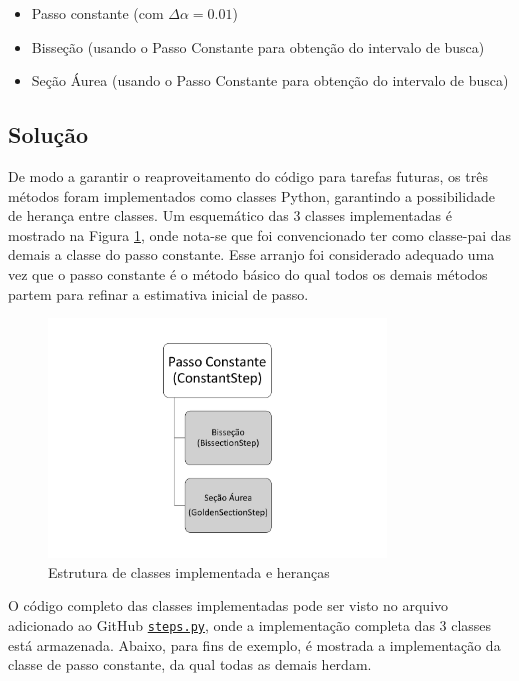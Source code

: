 \documentclass[10pt, a4paper]{article}
\begin{document}
\begin{itemize}
  \item Passo constante (com $\Delta\alpha = 0.01$)
  \item Bisseção (usando o Passo Constante para obtenção do intervalo de busca)
  \item Seção Áurea (usando o Passo Constante para obtenção do intervalo de busca)
\end{itemize}

\subsection{Solução}

De modo a garantir o reaproveitamento do código para tarefas futuras, os três métodos foram implementados como classes Python, garantindo a 
possibilidade de herança entre classes. Um esquemático das 3 classes implementadas é mostrado na Figura \ref{fig:q1_1}, onde nota-se que foi convencionado
ter como classe-pai das demais a classe do passo constante. Esse arranjo foi considerado adequado uma vez que o passo constante é o método básico do qual todos
os demais métodos partem para refinar a estimativa inicial de passo.

\begin{figure}[htpb]
  \centering
  \includegraphics[width=0.8\textwidth]{images/classes.pdf}
  \caption{Estrutura de classes implementada e heranças}
  \label{fig:q1_1}
\end{figure}

O código completo das classes implementadas pode ser visto no arquivo adicionado ao GitHub 
{\tt \href{https://github.com/prj-phcp/MEC2403_Activities/blob/master/packages/steps.py}{steps.py}},
onde a implementação completa das 3 classes está armazenada. Abaixo, para fins de exemplo, é mostrada a implementação da classe de passo constante, da qual todas 
as demais herdam.
\end{document}

